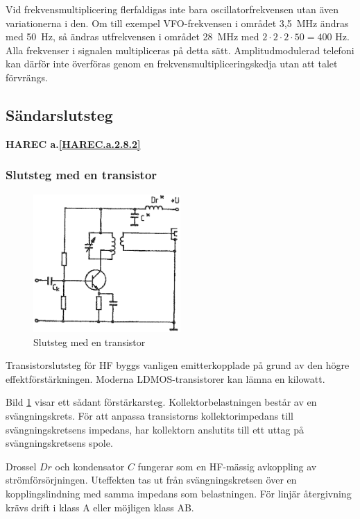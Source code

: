 Vid frekvensmultiplicering flerfaldigas inte bara oscillatorfrekvensen utan
även variationerna i den.
Om till exempel VFO-frekvensen i området 3,5~MHz ändras med 50~Hz, så ändras
utfrekvensen i området 28~MHz med \(2 \cdot 2 \cdot 2 \cdot 50 = 400\) Hz.
Alla frekvenser i signalen multipliceras på detta sätt.
Amplitudmodulerad telefoni kan därför inte överföras genom en
frekvensmultipliceringskedja utan att talet förvrängs.

\subsection{Sändarslutsteg}
\textbf{HAREC a.\ref{HAREC.a.2.8.2}\label{myHAREC.a.2.8.2}}

\subsubsection{Slutsteg med en transistor}

\begin{figure}
\includegraphics[width=0.5\textwidth]{images/cropped_pdfs/bild_2_3-48.pdf}
\caption{Slutsteg med en transistor}
\label{fig:BildII3-48}
\end{figure}

Transistorslutsteg för HF byggs vanligen emitterkopplade på grund av den
högre effektförstärkningen.
Moderna LDMOS-transistorer kan lämna en kilowatt.

Bild \ref{fig:BildII3-48} visar ett sådant förstärkarsteg.
Kollektorbelastningen består av en svängningskrets.
För att anpassa transistorns kollektorimpedans till svängningskretsens
impedans, har kollektorn anslutits till ett uttag på svängningskretsens spole.

Drossel \(Dr\) och kondensator \(C\) fungerar som en HF-mässig
avkoppling av strömförsörjningen.
Uteffekten tas ut från svängningskretsen över en kopplingslindning med samma
impedans som belastningen.
För linjär återgivning krävs drift i klass A eller möjligen klass AB.

